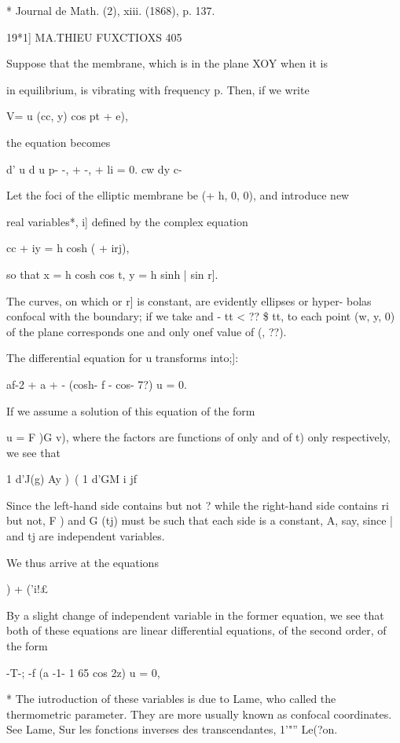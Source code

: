* Journal de Math. (2), xiii. (1868), p. 137.

19*1] MA.THIEU FUXCTIOXS 405

Suppose that the membrane, which is in the plane XOY when it is

in equilibrium, is vibrating with frequency p. Then, if we write

V= u (cc, y) cos pt + e),

the equation becomes

d' u d u p- -, + -, + li = 0. cw dy c-

Let the foci of the elliptic membrane be (+ h, 0, 0), and introduce
new

real variables*, i] defined by the complex equation

cc + iy = h cosh ( + irj),

so that x = h cosh cos t, y = h sinh | sin r].

The curves, on which or r] is constant, are evidently ellipses or
hyper- bolas confocal with the boundary; if we take and - tt < ?? \$
tt, to each point (w, y, 0) of the plane corresponds one and only onef
value of (, ??).

The differential equation for u transforms into;]:

af-2 + a + - (cosh- f - cos- 7?) u = 0.

If we assume a solution of this equation of the form

u = F )G v), where the factors are functions of only and of t) only
respectively, we see that

1 d'J(g) Ay )\ ( 1 d'GM i jf

Since the left-hand side contains but not ? while the right-hand side
contains ri but not, F ) and G (tj) must be such that each side is a
constant, A, say, since | and tj are independent variables.

We thus arrive at the equations

 ) + ('i!£%

By a slight change of independent variable in the former equation, we
see that both of these equations are linear differential equations, of
the second order, of the form

-T-; -f (a -1- 1 65 cos 2z) u = 0,

* The iutroduction of these variables is due to Lame, who called the
thermometric parameter. They are more usually known as confocal
coordinates. See Lame, Sur les fonctions inverses des transcendantes,
1'"'' Le(?on.

